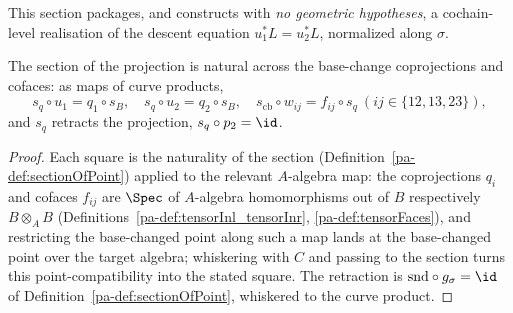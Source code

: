This section packages, and constructs with \emph{no geometric hypotheses}, a cochain-level
realisation of the descent equation \(u_1^{*} L = u_2^{*} L\), normalized along \(\sigma\).

\begin{lemma}
  \label{pa-lem:sectionSquares}
  \leanok

  The section of the projection is natural across the base-change coprojections and cofaces: as
  maps of curve products,
  \[
    s_q \circ u_1 = q_1 \circ s_B, \quad s_q \circ u_2 = q_2 \circ s_B, \quad
    s_{\mathrm{cb}} \circ w_{ij} = f_{ij} \circ s_q \ (ij \in \{12,13,23\}),
  \]
  and \(s_q\) retracts the projection, \(s_q \circ p_2 = \id\).
\end{lemma}
\begin{proof}
  \leanok
  Each square is the naturality of the section (Definition~\ref{pa-def:sectionOfPoint}) applied to
  the relevant \(A\)-algebra map: the coprojections \(q_i\) and cofaces \(f_{ij}\) are
  \(\Spec\) of \(A\)-algebra homomorphisms out of \(B\) respectively \(B \otimes_A B\)
  (Definitions~\ref{pa-def:tensorInl_tensorInr}, \ref{pa-def:tensorFaces}), and restricting the
  base-changed point along such a map lands at the base-changed point over the target algebra;
  whiskering with \(C\) and passing to the section turns this point-compatibility into the stated
  square. The retraction is \(\mathrm{snd} \circ g_\sigma = \id\) of
  Definition~\ref{pa-def:sectionOfPoint}, whiskered to the curve product.
\end{proof}


